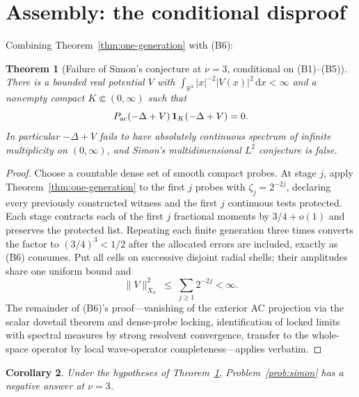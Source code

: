 \documentclass[11pt]{article}
\newtheorem{theorem}{Theorem}[section]
\newtheorem{corollary}[theorem]{Corollary}
\theoremstyle{remark}
\theoremstyle{definition}
\newcommand{\dd}{\,\mathrm d}
\newcommand{\ac}{{\rm ac}}
\begin{document}
\section{Assembly: the conditional disproof}\label{sec:assembly}

Combining Theorem~\ref{thm:one-generation} with (B6):

\begin{theorem}[Failure of Simon's conjecture at $\nu=3$, conditional on (B1)--(B5)]
\label{thm:main}
There is a bounded real potential $V$ with
$\int_{\mathbb R^3}|x|^{-2}|V(x)|^2\dd x<\infty$ and a nonempty compact
$K\Subset(0,\infty)$ such that
\begin{equation}
 P_{\ac}(-\Delta+V)\,\mathbf 1_K(-\Delta+V)=0 .
 \label{eq:main-counterexample}
\end{equation}
In particular $-\Delta+V$ fails to have absolutely continuous spectrum of
infinite multiplicity on $(0,\infty)$, and Simon's multidimensional $L^2$
conjecture is false.
\end{theorem}

\begin{proof}
Choose a countable dense set of smooth compact probes.  At stage $j$, apply
Theorem~\ref{thm:one-generation} to the first $j$ probes with
$\zeta_j=2^{-2j}$, declaring every previously constructed witness and the
first $j$ continuous tests protected.  Each stage contracts each of the first
$j$ fractional moments by $3/4+o(1)$ and preserves the protected list.
Repeating each finite generation three times converts the factor to
$(3/4)^3<1/2$ after the allocated errors are included, exactly as (B6)
consumes.  Put all cells on successive disjoint radial shells; their
amplitudes share one uniform bound and
\begin{equation}
 \|V\|_{X_3}^2\;\leq\;\sum_{j\geq1}2^{-2j}<\infty .
 \label{eq:x3-budget}
\end{equation}
The remainder of (B6)'s proof---vanishing of the exterior AC projection via
the scalar dovetail theorem and dense-probe locking, identification of locked
limits with spectral measures by strong resolvent convergence, transfer to the
whole-space operator by local wave-operator completeness---applies verbatim.
\end{proof}

\begin{corollary}
Under the hypotheses of Theorem~\ref{thm:main}, Problem~\ref{prob:simon} has
a negative answer at $\nu=3$.
\end{corollary}
\end{document}

